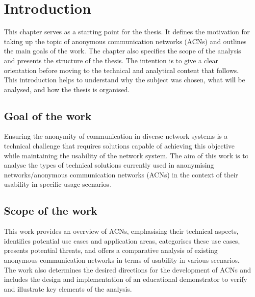 \chapter{Introduction}
\label{chap:Introduction}
This chapter serves as a starting point for the thesis. It defines the motivation for taking up the topic of anonymous communication networks (ACNs) and outlines the main goals of the work. The chapter also specifies the scope of the analysis and presents the structure of the thesis. The intention is to give a clear orientation before moving to the technical and analytical content that follows. This introduction helps to understand why the subject was chosen, what will be analysed, and how the thesis is organised.

\section{Goal of the work}
Ensuring the anonymity of communication in diverse network systems is a technical challenge that requires solutions capable of achieving this objective while maintaining the usability of the network system. The aim of this work is to analyse the types of technical solutions currently used in anonymising networks/anonymous communication networks (ACNs) in the context of their usability in specific usage scenarios.

\section{Scope of the work}
This work provides an overview of ACNs, emphasising their technical aspects, identifies potential use cases and application areas, categorises these use cases, presents potential threats, and offers a comparative analysis of existing anonymous communication networks in terms of usability in various scenarios. The work also determines the desired directions for the development of ACNs and includes the design and implementation of an educational demonstrator to verify and illustrate key elements of the analysis.

